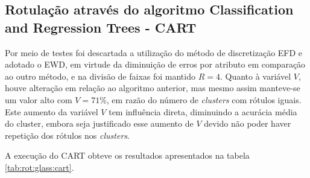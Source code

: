 \subsection{Rotulação através do algoritmo Classification and Regression Trees - CART} \label{cap:resultados:ssec:glass:cart}


Por meio de testes foi descartada a utilização do método de discretização EFD e adotado o EWD, em virtude da diminuição de erros por atributo em comparação ao outro método, e na divisão de faixas foi mantido ${R=4}$. Quanto à variável ${V}$, houve alteração em relação ao algoritmo anterior, mas mesmo assim manteve-se um valor alto com  ${V=71\%}$, em razão do número de \textit{clusters} com rótulos iguais. Este aumento da variável ${V}$ tem influência direta, diminuindo a acurácia média do cluster, embora seja justificado esse aumento de ${V}$ devido não poder haver repetição dos rótulos nos \textit{clusters}. 

A execução do CART obteve os resultados apresentados na tabela \ref{tab:rot:glass:cart}.

